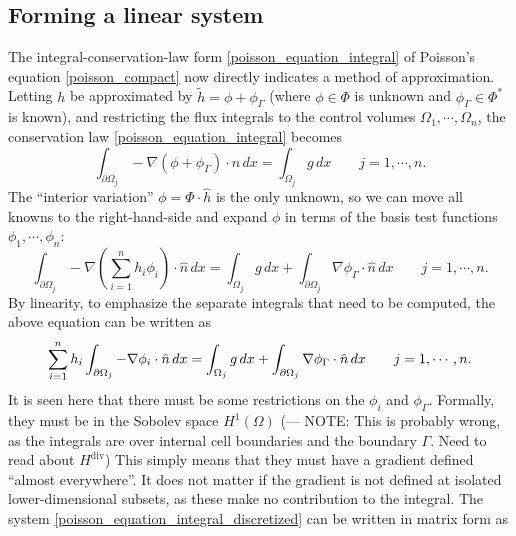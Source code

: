 \subsection{Forming a linear system}
The integral-conservation-law form \eqref{poisson_equation_integral} of Poisson's equation \eqref{poisson_compact}
now directly indicates a method of approximation. Letting $h$ be approximated by $\tilde{h} = \phi + \phi_\Gamma$ (where $\phi \in \Phi$ is unknown and $\phi_\Gamma \in \Phi^*$ is known),
and restricting the flux integrals to the control volumes $\Omega_1,\cdots,\Omega_n$, the conservation law \eqref{poisson_equation_integral} becomes
\begin{equation}\label{poisson_equation_integral_fvm}
    \int_{\partial\Omega_j} -\nabla \left(\phi + \phi_\Gamma\right) \cdot \hat{n}\,dx = \int_{\Omega_j} g\,dx \quad\quad j=1,\cdots,n.
\end{equation}
The ``interior variation'' $\phi = \Phi\cdot \hat{h}$ is the only unknown, so we can move all knowns to the right-hand-side
and expand $\phi$ in terms of the basis test functions $\phi_1,\cdots,\phi_n$:
\begin{equation}\label{poisson_equation_integral_fvm_knowns_unknowns}
    \int_{\partial\Omega_j} -\nabla \left(\sum_{i=1}^nh_i\phi_i\right) \cdot \hat{n}\,dx =
            \int_{\Omega_j} g\,dx
            + \int_{\partial\Omega_j} \nabla \phi_\Gamma \cdot \hat{n}\,dx
 \quad\quad j=1,\cdots,n.
\end{equation}
By linearity, to emphasize the separate integrals that need to be computed, the above equation can be written as
\begin{equation}\label{poisson_equation_integral_discretized}
    \sum_{i=1}^n h_i\int_{{\partial\Omega}_j} -\nabla \phi_i \cdot \hat{n}\,dx =
            \int_{\Omega_j} g\,dx
            + \int_{\partial\Omega_j} \nabla \phi_\Gamma \cdot \hat{n}\,dx
 \quad\quad j=1,\cdots,n.
\end{equation}
It is seen here that there must be some restrictions on the $\phi_i$ and $\phi_\Gamma$.
Formally, they must be in the Sobolev space $H^1(\Omega)$
(--- NOTE: This is probably wrong, as the integrals are over internal cell boundaries and the boundary $\Gamma$. Need to read
about $H^{\text{div}}$)
This simply means that they must have a gradient defined ``almost everywhere''.
It does not matter if the gradient is not defined at isolated lower-dimensional subsets, as these make no contribution to
the integral. The system \eqref{poisson_equation_integral_discretized} can be written in matrix form as
